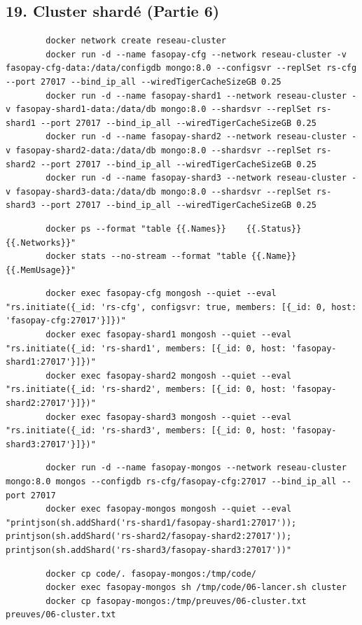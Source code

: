 \documentclass[11pt,a4paper]{article}
\begin{document}
	\subsection*{19. Cluster shardé (Partie 6)}
	\begin{lstlisting}
		docker network create reseau-cluster
		docker run -d --name fasopay-cfg --network reseau-cluster -v fasopay-cfg-data:/data/configdb mongo:8.0 --configsvr --replSet rs-cfg --port 27017 --bind_ip_all --wiredTigerCacheSizeGB 0.25
		docker run -d --name fasopay-shard1 --network reseau-cluster -v fasopay-shard1-data:/data/db mongo:8.0 --shardsvr --replSet rs-shard1 --port 27017 --bind_ip_all --wiredTigerCacheSizeGB 0.25
		docker run -d --name fasopay-shard2 --network reseau-cluster -v fasopay-shard2-data:/data/db mongo:8.0 --shardsvr --replSet rs-shard2 --port 27017 --bind_ip_all --wiredTigerCacheSizeGB 0.25
		docker run -d --name fasopay-shard3 --network reseau-cluster -v fasopay-shard3-data:/data/db mongo:8.0 --shardsvr --replSet rs-shard3 --port 27017 --bind_ip_all --wiredTigerCacheSizeGB 0.25
	\end{lstlisting}
	\begin{lstlisting}
		docker ps --format "table {{.Names}}	{{.Status}}	{{.Networks}}"
		docker stats --no-stream --format "table {{.Name}}	{{.MemUsage}}"
	\end{lstlisting}
	\begin{lstlisting}
		docker exec fasopay-cfg mongosh --quiet --eval "rs.initiate({_id: 'rs-cfg', configsvr: true, members: [{_id: 0, host: 'fasopay-cfg:27017'}]})"
		docker exec fasopay-shard1 mongosh --quiet --eval "rs.initiate({_id: 'rs-shard1', members: [{_id: 0, host: 'fasopay-shard1:27017'}]})"
		docker exec fasopay-shard2 mongosh --quiet --eval "rs.initiate({_id: 'rs-shard2', members: [{_id: 0, host: 'fasopay-shard2:27017'}]})"
		docker exec fasopay-shard3 mongosh --quiet --eval "rs.initiate({_id: 'rs-shard3', members: [{_id: 0, host: 'fasopay-shard3:27017'}]})"
	\end{lstlisting}
	\begin{lstlisting}
		docker run -d --name fasopay-mongos --network reseau-cluster mongo:8.0 mongos --configdb rs-cfg/fasopay-cfg:27017 --bind_ip_all --port 27017
		docker exec fasopay-mongos mongosh --quiet --eval "printjson(sh.addShard('rs-shard1/fasopay-shard1:27017')); printjson(sh.addShard('rs-shard2/fasopay-shard2:27017')); printjson(sh.addShard('rs-shard3/fasopay-shard3:27017'))"
	\end{lstlisting}
	\begin{lstlisting}
		docker cp code/. fasopay-mongos:/tmp/code/
		docker exec fasopay-mongos sh /tmp/code/06-lancer.sh cluster
		docker cp fasopay-mongos:/tmp/preuves/06-cluster.txt preuves/06-cluster.txt
	\end{lstlisting}
\end{document}
